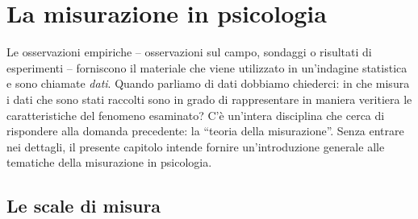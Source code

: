 \chapter{La misurazione in psicologia}
\label{chapter:misurazione} 


Le osservazioni empiriche -- osservazioni sul campo, sondaggi o risultati di esperimenti -- forniscono il materiale che viene utilizzato in un'indagine statistica e sono chiamate \emph{dati}. 
Quando parliamo di dati dobbiamo chiederci: in che misura i dati che sono stati raccolti sono in grado di rappresentare in maniera veritiera le caratteristiche del fenomeno  esaminato?
C'è un'intera disciplina che cerca di rispondere alla domanda precedente: la \enquote{teoria della misurazione}.
Senza entrare nei dettagli, il presente capitolo intende fornire un'introduzione generale alle tematiche della misurazione in psicologia.


\section{Le scale di misura}

